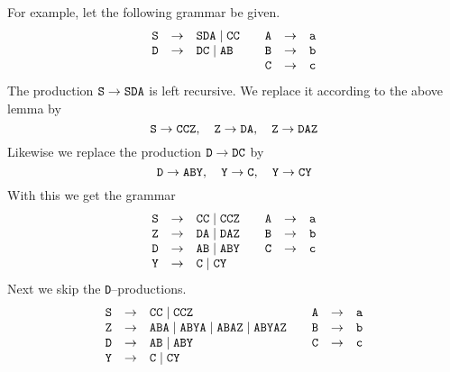 For example, let the following grammar be given.
\begin{equation}
\begin{array}{l@{\quad\pf\quad}l@{\qquad}l@{\quad\pf\quad}l}
\mbox{\tt S} & \mbox{\tt SDA} \mid \mbox{\tt CC} &
	\mbox{\tt A} & \mbox{\tt a} \\
\mbox{\tt D} & \mbox{\tt DC} \mid \mbox{\tt AB} &
	\mbox{\tt B} & \mbox{\tt b} \\
\multicolumn{2}{c}{} &
	\mbox{\tt C} & \mbox{\tt c}
\end{array}
\end{equation}
The production $\mbox{\tt S} \rightarrow \mbox{\tt SDA}$ is
left recursive. We replace it according to the above lemma
by
\begin{equation}
\mbox{\tt S} \rightarrow \mbox{\tt CCZ},
\quad \mbox{\tt Z} \rightarrow \mbox{\tt DA},
\quad \mbox{\tt Z} \rightarrow \mbox{\tt DAZ} 
\end{equation}
Likewise we replace the production $\mbox{\tt D} \rightarrow\mbox{\tt DC}$ by
\begin{equation}
\mbox{\tt D} \rightarrow \mbox{\tt ABY},
\quad \mbox{\tt Y} \rightarrow \mbox{\tt C},
\quad \mbox{\tt Y} \rightarrow \mbox{\tt CY}
\end{equation}
With this we get the grammar
\begin{equation}
\begin{array}{l@{\quad\pf\quad}l@{\qquad}l@{\quad\pf\quad}l}
\mbox{\tt S} & \mbox{\tt CC} \mid \mbox{\tt CCZ} &
	\mbox{\tt A} & \mbox{\tt a} \\
\mbox{\tt Z} & \mbox{\tt DA} \mid \mbox{\tt DAZ} &
	\mbox{\tt B} & \mbox{\tt b} \\
\mbox{\tt D} & \mbox{\tt AB} \mid \mbox{\tt ABY} &
	\mbox{\tt C} & \mbox{\tt c} \\
\mbox{\tt Y} & \mbox{\tt C} \mid \mbox{\tt CY} & 
	\multicolumn{2}{c}{} \\
\end{array}
\end{equation}
Next we skip the {\tt D}--productions.
\begin{equation}
\begin{array}{l@{\quad\pf\quad}l@{\qquad}l@{\quad\pf\quad}l}
\mbox{\tt S} & \mbox{\tt CC} \mid \mbox{\tt CCZ} &
	\mbox{\tt A} & \mbox{\tt a} \\
\mbox{\tt Z} & \mbox{\tt ABA} \mid \mbox{\tt ABYA}
    \mid \mbox{\tt ABAZ} \mid \mbox{\tt ABYAZ} & 
	\mbox{\tt B} & \mbox{\tt b} \\
\mbox{\tt D} & \mbox{\tt AB} \mid \mbox{\tt ABY} &
	\mbox{\tt C} & \mbox{\tt c} \\
\mbox{\tt Y} & \mbox{\tt C} \mid \mbox{\tt CY} & 
	\multicolumn{2}{c}{} 
\end{array}
\end{equation}
